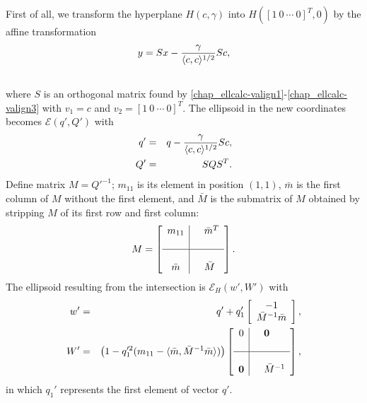 \documentclass[letterpaper,10pt,english]{sphinxmanual}
\begin{document}
First of all, we transform the hyperplane $H(c,\gamma)$ into
$H([1~0~\cdots~0]^T, 0)$ by the affine transformation
\begin{gather}
\begin{split}y = Sx - \frac{\gamma}{\langle c,c\rangle^{1/2}}Sc,\end{split}\notag\\\begin{split}\end{split}\notag
\end{gather}
where $S$ is an orthogonal matrix found by \eqref{chap_ellcalc-valign1}-\eqref{chap_ellcalc-valign3}
with $v_1=c$ and $v_2=[1~0~\cdots~0]^T$. The ellipsoid in
the new coordinates becomes ${\mathcal E}(q',Q')$ with
\begin{gather}
\begin{split}\begin{aligned}
q' & = & q-\frac{\gamma}{\langle c,c\rangle^{1/2}}Sc, \\
Q' & = & SQS^T.\end{aligned}\end{split}\notag
\end{gather}
Define matrix $M=Q'^{-1}$; $m_{11}$ is its element in
position $(1,1)$, $\bar{m}$ is the first column of $M$
without the first element, and $\bar{M}$ is the submatrix of
$M$ obtained by stripping $M$ of its first row and first
column:
\begin{gather}
\begin{split}M = \left[\begin{array}{c|cl}
m_{11} & & \bar{m}^T\\
 & \\
\hline
 & \\
\bar{m} & & \bar{M}\end{array}\right].\end{split}\notag
\end{gather}
The ellipsoid resulting from the intersection is
${\mathcal E}_H(w',W')$ with
\begin{gather}
\begin{split}\begin{aligned}
w' & = & q' + q_1'\left[\begin{array}{c}
-1\\
\bar{M}^{-1}\bar{m}\end{array}\right],\\
W' & = & \left(1-q_1'^2(m_{11}-
\langle\bar{m},\bar{M}^{-1}\bar{m}\rangle)\right)\left[\begin{array}{c|cl}
0 & & {\bf 0}\\
 & \\
\hline
 & \\
{\bf 0} & & \bar{M}^{-1}\end{array}\right],\end{aligned}\end{split}\notag
\end{gather}
in which $q_1'$ represents the first element of vector $q'$.
\end{document}
